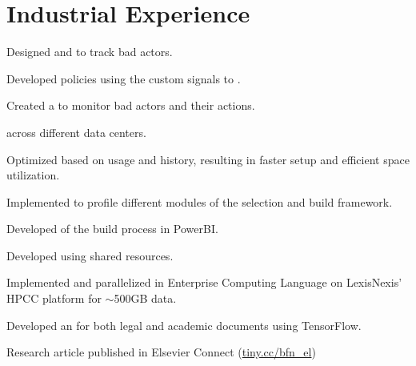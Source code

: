\documentclass[]{bigfatnoob-resume}
\begin{document}
\begin{minipage}[t]{0.65\textwidth} 




\section{Industrial Experience}
\begin{tightemize}
    \vspace{\topsep} %
    \item Designed and  to track bad actors. 
    \item Developed policies using the custom signals to .
    \item Created a  to monitor bad actors and their actions.
    \item {} across different data centers.
\end{tightemize}
\sectionsep

\begin{tightemize}
    \item Optimized  based on usage and history, resulting in faster setup and efficient space utilization.
    \item Implemented  to profile different modules of the selection and build framework.
    \item Developed  of the build process in PowerBI.
    \item Developed  using shared  resources.
\end{tightemize}
\sectionsep

\begin{tightemize}
	\item Implemented and parallelized  in Enterprise Computing Language  on LexisNexis' HPCC platform for $\sim$500GB data.
	\item Developed an  for both legal and academic documents using TensorFlow.
	\item Research article published in Elsevier Connect (\href{https://www.elsevier.com/connect/how-does-your-research-influence-legislation-text-mining-may-reveal-the-answer}{tiny.cc/bfn\_el}) 
\end{tightemize}
\sectionsep


\end{minipage}
\end{document}
